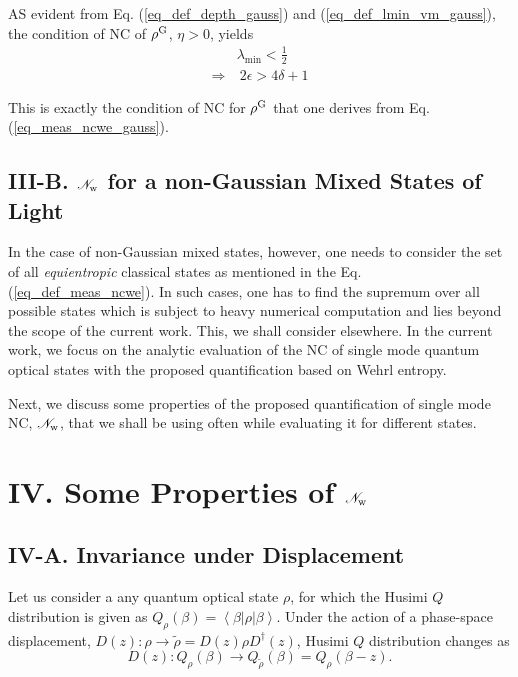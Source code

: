 \documentclass[letter,scriptaddress,twocolumn,prl,showkeys]{revtex4}
\newcommand{\ket}[1]{\left| #1 \right\rangle}
\newcommand{\bra}[1]{\left\langle #1 \right|}
\begin{document}
AS evident from Eq. (\ref{eq_def_depth_gauss}) and (\ref{eq_def_lmin_vm_gauss}), the condition of NC of $\rho^{\rm{G}}$, $\eta>0$, yields
\begin{align}
&\lambda_{\min}<\frac{1}{2} \nonumber \\
\Rightarrow&~ 2\epsilon> 4\delta+1  
\label{eq_cond_nc_depth}
\end{align}

This is exactly the condition of NC for $\rho^{\rm{G}}$ that one derives from Eq. (\ref{eq_meas_ncwe_gauss}).

\subsection*{III-B. $\mathscr{N}_{\rm{w}}$ for a non-Gaussian Mixed States of Light}

In the case of non-Gaussian mixed states, however, one needs to consider the set of all {\em equientropic} classical states as mentioned in the Eq. (\ref{eq_def_meas_ncwe}).
In such cases, one has to find the supremum over all possible states which is subject to heavy numerical computation and lies beyond the scope of the current work. 
This, we shall consider elsewhere.
In the current work, we focus on the analytic evaluation of the NC of single mode quantum optical states with the proposed quantification based on Wehrl entropy.
 
Next, we discuss some properties of the proposed quantification of single mode NC, $\mathscr{N}_{\rm{w}}$, that we shall be using often while evaluating it for different states.

\section*{IV. Some Properties of $\mathscr{N}_{\rm{w}}$}

\subsection*{IV-A. Invariance under Displacement}

Let us consider a any quantum optical state $\rho$, for which the Husimi $Q$ distribution is given as $Q_{\rho}(\beta)=\bra\beta\rho\ket\beta$. 
Under the action of a phase-space displacement, $D(z):\rho\rightarrow\tilde{\rho}= D(z)\rho D^{\dagger}(z)$, Husimi $Q$ distribution changes as
\begin{equation}
D(z):Q_{\rho}(\beta)\rightarrow Q_{\tilde{\rho}}(\beta)= Q_{\rho}(\beta-z).
\label{eq_qdist_invar_displace}
\end{equation}
\end{document}
